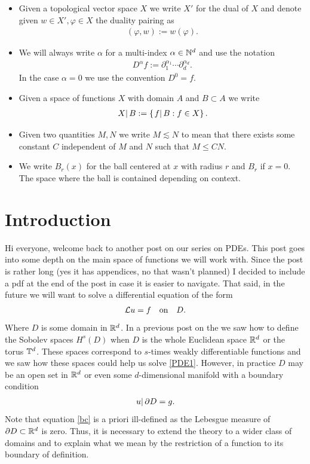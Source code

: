 \documentclass[
    a4paper,
    DIV=14,
    abstract=true,
    numbers=noenddot
]{scrartcl}
\begin{document}
\begin{itemize}
	\item Given a topological vector space $X$ we write $X'$ for the dual of  $X $ and denote given  $w \in X', \varphi \in X$ the duality pairing as
	      \begin{align*}
		      (\varphi,w):= w(\varphi) .
	      \end{align*}
	\item We will always write $\alpha$ for a multi-index $\alpha \in \mathbb{N}^d$ and use the notation
	      \begin{align*}
		      D^\alpha f := \partial _1^{\alpha_1}\cdots \partial _d^{\alpha_d}.
	      \end{align*}
	      In the case $\alpha =0$ we use the convention $D^0 =f$.
	\item Given  a space of functions $X$ with domain $A$ and $B \subset A $ we write
	      \begin{align*}
		      \left.X\right|{B}:=\left\{\left.f\right|{B}: f\in X\right\} .
	      \end{align*}
	\item Given two quantities $M,N$ we write $M \lesssim N$ to mean that there exists some constant $C$ independent of  $M$ and  $N$ such that  $M \leq C N$.
	\item We write $B_r(x)$ for the ball centered at  $x$ with radius  $r$ and  $B_r$ if $x=0$. The space where the ball is contained depending on context.

\end{itemize}
\section{Introduction}
Hi everyone, welcome back to another post on our series on PDEs. This post goes into some depth on the main space of functions we will work with. Since the post is rather long (yes it has appendices, no that wasn't planned) I decided to include a pdf at the end of the post in case it is easier to navigate. That said, in the future we will want to solve a differential equation of the form
\begin{align}\label{PDE1}
	\mathcal{L} u = f\quad  \mathrm{ on  }\quad  D .
\end{align}
Where $D$ is some domain in $\mathbb{R}^d$. In a previous post on the  we saw how to define the Sobolev spaces $H^s(D)$ when $D$ is the whole Euclidean space $\mathbb{R}^d$ or the torus $\mathbb{T}^d$. These spaces correspond to $s$-times weakly differentiable functions and we saw how these spaces could help us solve \eqref{PDE1}. However, in practice $D$ may be an open set in $\mathbb{R}^d$ or even some $d$-dimensional manifold with a boundary condition
\begin{align}\label{bc}
	\left.u\right|{\partial  D}= g.
\end{align}
Note that equation \eqref{bc} is a priori ill-defined as the Lebesgue measure of $\partial D \subset \mathbb{R}^d $ is zero.     Thus, it is necessary to extend the theory to a wider class of domains and to explain what we mean by the restriction of a function to its boundary of definition.
\end{document}
